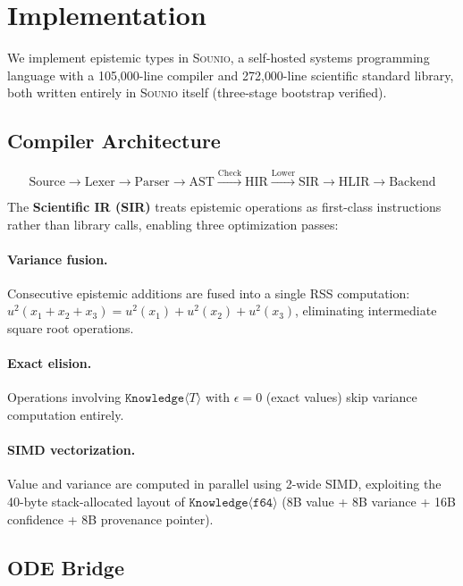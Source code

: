 \documentclass[acmsmall,screen,review,anonymous]{acmart}
\newcommand{\sounio}{\textsc{Sounio}\xspace}
\newcommand{\know}[1]{\texttt{Knowledge}\langle #1 \rangle}
\newcommand{\eps}{\epsilon}
\begin{document}
\section{Implementation}
\label{sec:implementation}

We implement epistemic types in \sounio, a self-hosted systems programming
language with a 105{,}000-line compiler and 272{,}000-line scientific
standard library, both written entirely in \sounio itself
(three-stage bootstrap verified).

\subsection{Compiler Architecture}

\[
\text{Source} \to \text{Lexer} \to \text{Parser} \to \text{AST}
\xrightarrow{\text{Check}} \text{HIR}
\xrightarrow{\text{Lower}} \text{SIR}
\to \text{HLIR} \to \text{Backend}
\]

The \textbf{Scientific IR (SIR)} treats epistemic operations as
first-class instructions rather than library calls, enabling three
optimization passes:

\paragraph{Variance fusion.}
Consecutive epistemic additions are fused into a single RSS computation:
$u^2(x_1 + x_2 + x_3) = u^2(x_1) + u^2(x_2) + u^2(x_3)$,
eliminating intermediate square root operations.

\paragraph{Exact elision.}
Operations involving $\know{T}$ with $\eps = 0$ (exact values)
skip variance computation entirely.

\paragraph{SIMD vectorization.}
Value and variance are computed in parallel using 2-wide SIMD,
exploiting the 40-byte stack-allocated layout of $\know{\texttt{f64}}$
(8B value + 8B variance + 16B confidence + 8B provenance pointer).

\subsection{ODE Bridge}
\end{document}
